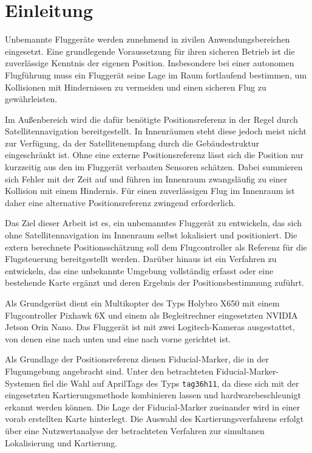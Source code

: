 
\chapter{Einleitung}

Unbemannte Fluggeräte werden zunehmend in zivilen Anwendungsbereichen eingesetzt.
Eine grundlegende Voraussetzung für ihren sicheren Betrieb ist die zuverlässige Kenntnis der eigenen Position.
Insbesondere bei einer autonomen Flugführung muss ein Fluggerät seine Lage im Raum fortlaufend bestimmen, um Kollisionen mit Hindernissen zu vermeiden und einen sicheren Flug zu gewährleisten.

Im Außenbereich wird die dafür benötigte Positionsreferenz in der Regel durch Satellitennavigation bereitgestellt.
In Innenräumen steht diese jedoch meist nicht zur Verfügung, da der Satellitenempfang durch die Gebäudestruktur eingeschränkt ist.
Ohne eine externe Positionsreferenz lässt sich die Position nur kurzzeitig aus den im Fluggerät verbauten Sensoren schätzen.
Dabei summieren sich Fehler mit der Zeit auf und führen im Innenraum zwangsläufig zu einer Kollision mit einem Hindernis.
Für einen zuverlässigen Flug im Innenraum ist daher eine alternative Positionsreferenz zwingend erforderlich.

Das Ziel dieser Arbeit ist es, ein unbemanntes Fluggerät zu entwickeln, das sich ohne Satellitennavigation im Innenraum selbst lokalisiert und positioniert.
Die extern berechnete Positionsschätzung soll dem Flugcontroller als Referenz für die Flugsteuerung bereitgestellt werden.
Darüber hinaus ist ein Verfahren zu entwickeln, das eine unbekannte Umgebung vollständig erfasst oder eine bestehende Karte ergänzt und deren Ergebnis der Positionsbestimmung zuführt.


Als Grundgerüst dient ein Multikopter des Typs Holybro X650 mit einem Flugcontroller Pixhawk 6X und einem als Begleitrechner eingesetzten NVIDIA Jetson Orin Nano.
Das Fluggerät ist mit zwei Logitech-Kameras ausgestattet, von denen eine nach unten und eine nach vorne gerichtet ist.

Als Grundlage der Positionsreferenz dienen Fiducial-Marker, die in der Flugumgebung angebracht sind.
Unter den betrachteten Fiducial-Marker-Systemen fiel die Wahl auf AprilTags des Typs \texttt{tag36h11}, da diese sich mit der eingesetzten Kartierungsmethode kombinieren lassen und hardwarebeschleunigt erkannt werden können.
Die Lage der Fiducial-Marker zueinander wird in einer vorab erstellten Karte hinterlegt.
Die Auswahl des Kartierungsverfahrens erfolgt über eine Nutzwertanalyse der betrachteten Verfahren zur simultanen Lokalisierung und Kartierung.


